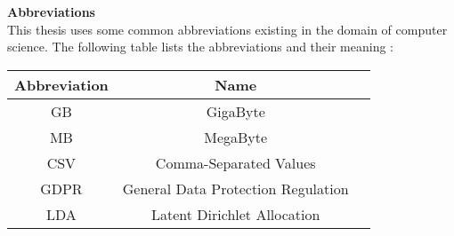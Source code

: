 \begin{center}
{\Large\bf Abbreviations}\\
This thesis uses some common abbreviations existing in the domain of computer science. The following table lists the abbreviations and their meaning :\\ \vspace{12pt}
\begin{tabular}{ccc}
  \hline
  Abbreviation & Name  \\
  \hline\hline
  GB & GigaByte \\ 
  MB & MegaByte \\
  CSV & Comma-Separated Values \\
  GDPR & General Data Protection Regulation &  \\
  LDA & Latent Dirichlet Allocation \\
  \hline
\end{tabular}
\end{center}
